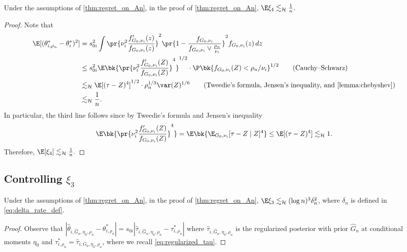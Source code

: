 \documentclass[12pt, reqno]{amsart}
\newcommand{\absauto}[1]{\left| #1 \right|}
\newcommand{\leH}{\lesssim_{\mathcal{H}}}
\numberwithin{equation}{section}
\begin{document}
\begin{refsection}
\begin{appendices}
\begin{lemma}
Under the assumptions of \cref{thm:regret_on_An}, in the proof of \cref{thm:regret_on_An},
$\E\xi_4 \leH \frac{1}{n}.$
\end{lemma}
\begin{proof}
Note that \begin{align*}
\E[(\theta^*_{i,\rho_n} - \theta^*_i)^2] &= s_{0i}^2 \int  \pr{ \nu_i^2 \frac{f'_{G_0,
\nu_i} (z)} {f_
{G_0,
\nu_i}
(z)}}^2 \pr{1-\frac{f_{G_0, \nu_i}}{f_{G_0, \nu_i} \vee \frac{\rho_n}{\nu_i}}}^2 f_{G_0,
\nu_i}
(z)\,dz \\
&\le s_{0i}^2 \E\bk{\pr{ \nu_i^2 \frac{f'_{G_0, \nu_i}(Z)}{f_
{G_0,
\nu_i}
(Z)}}^4}^{1/2} \cdot \P\bk{f_{G_0, \nu_i}(Z) < \rho_n /\nu_i}^{1/2} \tag{Cauchy--Schwarz}
\\
&\leH \E[(\tau-Z)^4]^{1/2} \cdot \rho_n^{1/3} \var(Z)^{1/6} \tag{Tweedie's formula,
Jensen's
inequality, and
\cref{lemma:chebyshev}}\\
&\leH \frac{1}{n}.
\end{align*}
In particular, the third line follows since by Tweedie's formula and Jensen's inequality 
\[
\E\bk{\pr{ \nu_i^2 \frac{f'_{G_0, \nu_i}(Z)}{f_
{G_0,
\nu_i}
(Z)}}^4} = \E\bk{\E_{G_0, \nu_i}[\tau - Z \mid Z]^4} \le \E[(\tau-Z)^4] \leH 1. 
\]
Therefore, $\E[\xi_4] \leH \frac{1}{n}.$
\end{proof}


\subsection{Controlling $\xi_3$}
\label{sub:xi3}



\begin{lemma}

Under the assumptions of \cref{thm:regret_on_An}, in the proof of \cref{thm:regret_on_An},
$\E\xi_3 \leH  (\log n)^3 \delta_n^2$, where $\delta_n$ is defined in \eqref{eq:delta_rate_def}.
\end{lemma}
\begin{proof}
Observe that $
\absauto{
    \hat\theta_{i, \hat G_n, \eta_0, \rho_n} - \theta^*_{i, \rho_n}
} = s_{0i} \absauto{
    \hat \tau_{i, \hat G_n, \eta_0, \rho_n} - \tau^*_{i, \rho_n}
}
$
where $\hat \tau_{i, \hat G_n, \eta_0, \rho_n}$ is the regularized posterior with prior
$\hat G_n$ at conditional moments $\eta_0$ and $\tau^*_{i, \rho_n} = \hat\tau_{i, G_0,
\eta_0, \rho_n}$, where we recall \eqref{eq:regularized_tau}.


\end{proof}
\end{appendices}
\end{refsection}
\end{document}
